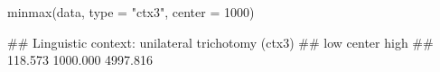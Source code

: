 \begin{Schunk}
% --begin: "minmax2"
\begin{Sinput}
minmax(data, type = "ctx3", center = 1000)
\end{Sinput}
\begin{Soutput}
## Linguistic context: unilateral trichotomy (ctx3)
##      low   center     high 
##  118.573 1000.000 4997.816
\end{Soutput}
%
% --end: "minmax2"
\end{Schunk}
